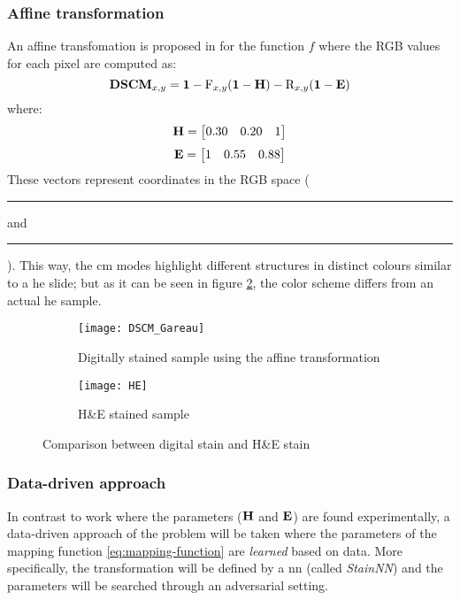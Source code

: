 \documentclass[../main.tex]{subfiles}
\begin{document}
\subsubsection{Affine transformation}
\label{sec:affine-transformation}
An affine transfomation is proposed in \cite{Gareau2009} for the function $f$
where the RGB values for each pixel are computed as:
\begin{equation} \label{eq:affine-transformation}
	\mathbf{DSCM}_{x,y} = \mathbf{1}
	- \text{F}_{x,y} (\mathbf{1} - \mathbf{H}) - \text{R}_{x,y} (\mathbf{1} - \mathbf{E})
\end{equation}
where:
$$ \mathbf{H} = \begin{bmatrix} 0.30 & 0.20 & 1 \end{bmatrix} $$
$$ \mathbf{E} = \begin{bmatrix} 1 & 0.55 & 0.88 \end{bmatrix} $$
These vectors represent coordinates in the RGB space (
\textcolor{Hcolor}{\rule{0.7\baselineskip}{0.7\baselineskip}} and
\textcolor{Ecolor}{\rule{0.7\baselineskip}{0.7\baselineskip}}).
This way, the \gls{cm} modes highlight different structures in distinct
colours similar to a \gls{he} slide; but as it can be seen in figure \ref{fig:affine-example},
the color scheme differs from an actual \gls{he} sample.

\begin{figure}[h]
\centering
\begin{subfigure}{.5\textwidth}
  \centering
  \texttt{[image: DSCM\_Gareau]}
  \caption{Digitally stained sample using the affine transformation}
\end{subfigure}%
\begin{subfigure}{.5\textwidth}
  \centering
  \texttt{[image: HE]}
  \caption{H\&E stained sample}
  \label{fig:HE-example}
\end{subfigure}
\caption{Comparison between digital stain and H\&E stain}
\label{fig:affine-example}
\end{figure}

\subsubsection{Data-driven approach}
In contrast to \cite{Gareau2009} work where the parameters
($\mathbf{H}$ and $\mathbf{E}$) are found experimentally, a data-driven approach
of the problem will be taken where the parameters of the mapping function
\eqref{eq:mapping-function} are \emph{learned} based on data.
More specifically, the transformation will be defined by a \gls{nn} (called \emph{StainNN})
and the parameters will be searched through an adversarial setting.
\end{document}
